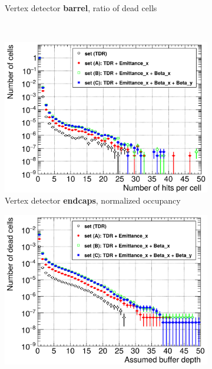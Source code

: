 \begin{figure}
\begin{subfigure}[b]{0.49\textwidth}
   \caption{Vertex detector \textbf{barrel}, ratio of dead cells}
   \end{subfigure}\\
  \begin{subfigure}[b]{0.49\textwidth}
   \centering
    \includegraphics[width=\textwidth]{Figures/Pairs/Occupancy_Comparison_Layer_0_numcells_ILC250_ALL_SETS_5T_w_antiDiD_SiVertexEndcap.png}
   \caption{Vertex detector \textbf{endcaps}, normalized occupancy}
   \end{subfigure}
   \hfill
    \begin{subfigure}[b]{0.49\textwidth}
   \centering
    \includegraphics[width=\textwidth]{Figures/Pairs/Occupancy_Comparison_Layer_0_deadcells_ILC250_ALL_SETS_5T_w_antiDiD_SiVertexEndcap.png}

\end{subfigure}
\end{figure}
